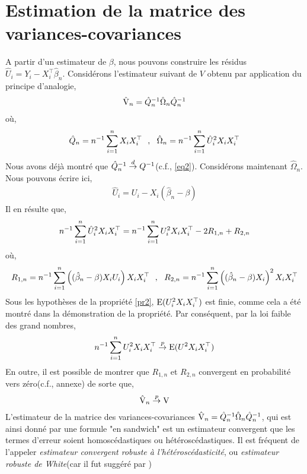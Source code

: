\section{Estimation de la matrice des variances-covariances}
A partir d'un estimateur de $\beta$, nous pouvons construire les résidus $\hat{U}_i = Y_i - X_i^\top \hat{\beta}_n$.  Considérons l'estimateur suivant de $V$ obtenu par application du principe d'analogie,
\begin{align*}
\hat{\operatorname{V}}_n = \hat{Q}_n^{-1} \hat{\Omega}_n \hat{Q}_n^{-1}
\end{align*}
où,
\begin{align*}
\hat{Q}_n = n^{-1}\sum_{i=1}^n X_iX_i^\top \ \ , \ \ \hat{\Omega}_n = n^{-1}\sum_{i=1}^n \hat{U}_i^2 X_iX_i^\top
\end{align*}
Nous avons déjà montré que $\hat{Q}_n ^{-1} \overset{d}{\rightarrow} Q^{-1}$(c.f., \eqref{eq2}). Considérons maintenant $\hat{\Omega}_n$. Nous pouvons écrire ici,
\begin{align*}
 \hat{U}_i  = U_i - X_i(\hat{\beta}_n- \beta)
\end{align*}
Il en résulte que,
\begin{align}
n^{-1}\sum_{i=1}^n \hat{U}_i^2 X_iX_i^\top = n^{-1} \sum_{i=1}^n U_i^2X_iX_i^\top - 2R_{1,n} + R_{2,n}
\label{eq5}
\end{align}
où,
\begin{align*}
R_{1,n} = n^{-1} \sumobs \left((\hat{\beta}_n- \beta)X_iU_i\right)X_iX_i^\top \ \  , \ \ 
R_{2,n} = n^{-1} \sumobs \left((\hat{\beta}_n- \beta)X_i\right)^2X_iX_i^\top
\end{align*}
Sous les hypothèses de la propriété \ref{pr2}, $\operatorname{E}(U_i^2X_iX_i^\top)$ est finie, comme cela a été montré dans la démonstration de la propriété. Par conséquent, par la loi faible des grand nombres,
\begin{align*}
n^{-1} \sum_{i=1}^n U_i^2 X_iX_i^\top \overset{p}{\rightarrow} \operatorname{E}(U^2X_iX_i^\top)
\end{align*}
En outre, il est possible de montrer que $R_{1,n}$ et $R_{2,n}$ convergent en probabilité vers zéro(c.f., annexe) de sorte que,
\begin{align*}
\hat{\operatorname{V}}_n \overset{p}{\rightarrow} \operatorname{V}
\end{align*}
L'estimateur de la matrice des variances-covariances $\hat{\operatorname{V}}_n = \hat{Q}_n^{-1} \hat{\Omega}_n  \hat{Q}_n^{-1}$, qui est ainsi donné par une formule "en sandwich" est un estimateur convergent que les termes d'erreur soient homoscédastiques ou hétéroscédastiques. Il est fréquent de l'appeler \emph{estimateur convergent robuste à l'hétéroscédasticité}, ou \emph{estimateur robuste de White}(car il fut suggéré par \citep{white1980})

